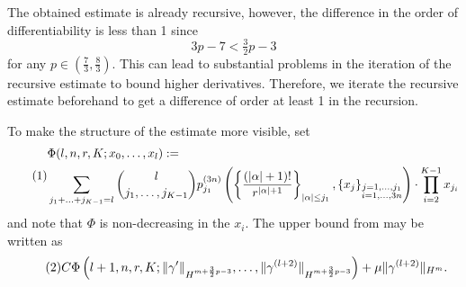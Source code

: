 The obtained estimate is already recursive, however, the difference in the order of differentiability is less than 1 since
\[
	3p-7 < \tfrac 32 p -3
\]
for any $p\in (\tfrac 73, \tfrac 83)$. This can lead to substantial problems in the iteration of the recursive estimate to bound higher derivatives. Therefore, we iterate the recursive estimate beforehand to get a difference of order at least 1 in the recursion. 


To make the structure of the estimate more visible, set
\[
\numberthis
\label{eq:definitionPhi} 
\begin{split}
&\Phi(l,n,r,K;x_0,\ldots,x_l) :=\\
&\sum_{j_1 + \ldots + j_{K-1} = l} \binom{l}{j_1,\ldots,j_{K-1}} p_{j_1}^{(3n)}\left( \left\{ \frac {(\abs{\alpha} +1)!} {r^{\abs{\alpha} +1} } \right\}_{\abs{\alpha} \leq j_1}, \left\{ x_j \right\}_{\substack{j=1,\ldots,j_1\\ i=1,\ldots, 3n}} \right) \cdot \prod_{i=2}^{K-1} x_{j_i}
\end{split}
\]
and note that $\Phi$ is non-decreasing in the $x_i$.
The upper bound from  may be written as 
\[
\numberthis
\label{eq:upperBoundMainTermPhi}
C \Phi\left(l+1,n,r,K;\norm[H^{m+\frac 3 2 p -3}]{\gamma'}, \ldots, \norm[H^{m+\frac 3 2 p -3}]{\gamma^{(l+2)}}\right) + \mu \norm[H^m]{\gamma^{(l+2)}}.
\]

